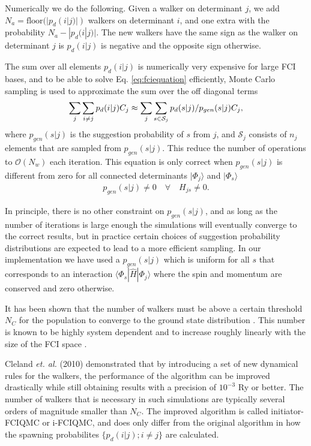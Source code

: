 \documentclass[aps,twocolumn,showpacs,floatfix,nofootinbib,preprintnumbers,superscriptaddress,amsmath,amssymb]{revtex4-1}
\newcommand{\expec}[1]{\langle #1 \rangle}
\begin{document}
Numerically we do the following. Given a walker on determinant $j$, we
add $N_a=\text{floor}(|p_d(i|j)|)$ walkers on determinant $i$, and one
extra with the probability $N_a-|p_d(i|j)|$. The new walkers have the
same sign as the walker on determinant $j$ is $p_d(i|j)$ is negative
and the opposite sign otherwise.

The sum over all elements $p_d{(i|j)}$ is numerically very expensive
for large FCI bases, and to be able to solve
Eq. \eqref{eq:fciequation} efficiently, Monte Carlo sampling is used
to approximate the sum over the off diagonal terms
\begin{align}
	\sum_j\sum_{i\neq j} p_d{(i|j)} C_{j} \approx \sum_j \sum _{s \in \mathcal S_j} p_d{(s|j)} / p_{gen}(s|j) C_j,\notag\\
	\label{eq:samplingrule}
\end{align}
where $p_{gen}(s|j)$ is the suggestion probability of $s$ from $j$,
and $\mathcal S_j$ consists of $n_j$ elements that are sampled from
$p_{gen}(s|j)$. This reduce the number of operations to $\mathcal
O(N_w)$ each iteration.
%
This equation is only correct when $p_{gen}(s|j)$ is different from
zero for all connected determinants $|\Phi_j\rangle$ and $|\Phi_s\rangle$
\begin{align}
	p_{gen}(s|j)\neq0 \quad\forall\quad H_{js} \neq 0.
\end{align}

In principle, there is no other constraint on $p_{gen}(s|j)$, and as
long as the number of iterations is large enough the simulations will
eventually converge to the correct results, but in practice certain
choices of suggestion probability distributions are expected to lead
to a more efficient sampling.  In our implementation we have used a
$p_{gen}(s|j)$ which is uniform for all $s$ that corresponds to an
interaction $\expec{\Phi_s|\hat H|\Phi_j}$ %
where the spin
and momentum are conserved and zero otherwise.


It has been shown that the number of walkers must be above a certain
threshold $N_C$ for the population to converge to the ground state
distribution \cite{spencer2012,bestref?booth?}. This number is known
to be highly system dependent and to increase roughly linearly with
the size of the FCI space \cite{bestref?}.
 
Cleland {\it et. al.}  (2010) \cite{cleland2010} demonstrated that by
introducing a set of new dynamical rules for the walkers, the
performance of the algorithm can be improved drastically while still
obtaining results with a precision of $10^{-3}$ Ry or better. The
number of walkers that is necessary in such simulations are typically
several orders of magnitude smaller than $N_C$.
%
The improved algorithm is called initiator-FCIQMC or i-FCIQMC, and
does only differ from the original algorithm in how the spawning
probabilites $\{p_d(i|j);i\neq j\}$ are calculated.
\end{document}
